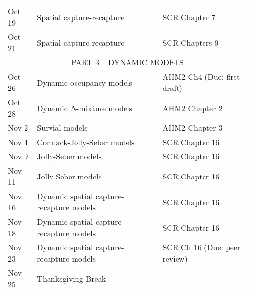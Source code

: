 \documentclass[12pt]{article}
\begin{document}
\begin{center}
\begin{tabular}[c]{lll}
\hline
Oct 19     & Spatial capture-recapture                    & SCR Chapter 7                                        \\
Oct 21     & Spatial capture-recapture                    & SCR Chapters 9                                 \\
\hline
           \multicolumn{3}{c}{PART 3 -- DYNAMIC MODELS}                                                          \\
\hline
Oct 26      & Dynamic occupancy models                     & AHM2 Ch4 (Due: first draft)                          \\
Oct 28      & Dynamic $N$-mixture models                   & AHM2 Chapter 2                                       \\
\hline
Nov 2     & Survial models                               & AHM2 Chapter 3                                       \\
Nov 4     & Cormack-Jolly-Seber models                   & SCR Chapter 16                                       \\
\hline
Nov 9     & Jolly-Seber models                           & SCR Chapter 16                                       \\
Nov 11    & Jolly-Seber models                           & SCR Chapter 16                                       \\
\hline
Nov 16     & Dynamic spatial capture-recapture models     & SCR Chapter 16                                       \\
Nov 18     & Dynamic spatial capture-recapture models     & SCR Chapter 16                                       \\
\hline
Nov 23     & Dynamic spatial capture-recapture models     & SCR Ch 16 (Due: peer review)                         \\
Nov 25     & Thanksgiving Break                           &                                                      \\

\end{tabular}
\end{center}
\end{document}
